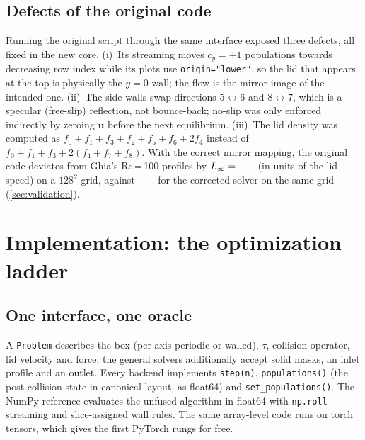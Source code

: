 \documentclass[11pt]{article}
\begin{document}
\subsection{Defects of the original code}
Running the original script through the same interface exposed three defects, all fixed in
the new core. (i)~Its streaming moves $c_y=+1$ populations towards decreasing row index while
its plots use \texttt{origin="lower"}, so the lid that appears at the top is physically the
$y=0$ wall; the flow is the mirror image of the intended one. (ii)~The side walls swap
directions $5\leftrightarrow6$ and $8\leftrightarrow7$, which is a specular (free-slip)
reflection, not bounce-back; no-slip was only enforced indirectly by zeroing $\mathbf{u}$
before the next equilibrium. (iii)~The lid density was computed as
$f_0+f_1+f_3+f_2+f_5+f_6+2f_4$ instead of $f_0+f_1+f_3+2(f_4+f_7+f_8)$. With the
correct mirror mapping, the original code deviates from Ghia's Re\,=\,100 profiles by
$L_\infty=--$ (in units of the lid speed) on a $128^2$ grid, against
$--$ for the corrected solver on the same grid (\cref{sec:validation}).

\section{Implementation: the optimization ladder}
\subsection{One interface, one oracle}
A \texttt{Problem} describes the box (per-axis periodic or walled), $\tau$, collision
operator, lid velocity and force; the general solvers additionally accept solid masks,
an inlet profile and an outlet. Every backend implements \texttt{step(n)},
\texttt{populations()} (the post-collision state in canonical layout, as float64) and
\texttt{set\_populations()}. The NumPy reference evaluates the unfused algorithm in float64
with \texttt{np.roll} streaming and slice-assigned wall rules. The same array-level code runs
on torch tensors, which gives the first PyTorch rungs for free.
\end{document}

